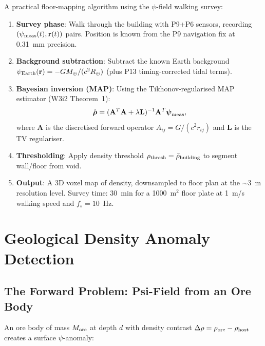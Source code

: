 \documentclass[aps,prd,twocolumn,superscriptaddress,nofootinbib]{revtex4-2}
\begin{document}
A practical floor-mapping algorithm using the $\psi$-field walking survey:

\begin{enumerate}
\item \textbf{Survey phase}: Walk through the building with P9+P6 sensors,
  recording $(\psi_{\rm meas}(t), \mathbf{r}(t))$ pairs.  Position is
  known from the P9 navigation fix at 0.31~mm precision.

\item \textbf{Background subtraction}: Subtract the known Earth background
  $\psi_{\rm Earth}(\mathbf{r}) = -GM_\oplus/(c^2 R_\oplus)$ (plus P13
  timing-corrected tidal terms).

\item \textbf{Bayesian inversion (MAP)}: Using the Tikhonov-regularised
  MAP estimator (W3i2 Theorem~1):
  \begin{equation}
    \hat{\boldsymbol{\rho}} = (\mathbf{A}^T\mathbf{A} + \lambda\mathbf{L})^{-1}
    \mathbf{A}^T \boldsymbol{\psi}_{\rm meas},
    \label{eq:floor-inversion}
  \end{equation}
  where $\mathbf{A}$ is the discretised forward operator
  $A_{ij} = G/(c^2 r_{ij})$ and $\mathbf{L}$ is the TV regulariser.

\item \textbf{Thresholding}: Apply density threshold
  $\rho_{\rm thresh} = \bar\rho_{\rm building}$ to segment
  wall/floor from void.

\item \textbf{Output}: A 3D voxel map of density, downsampled to floor
  plan at the $\sim 3$~m resolution level.  Survey time: 30~min for
  a 1000~m$^2$ floor plate at 1~m/s walking speed and $f_s = 10$~Hz.
\end{enumerate}

\section{Geological Density Anomaly Detection}
\label{sec:geology}

\subsection{The Forward Problem: Psi-Field from an Ore Body}

An ore body of mass $M_{\rm ore}$ at depth $d$ with density contrast
$\Delta\rho = \rho_{\rm ore} - \rho_{\rm host}$ creates a surface
$\psi$-anomaly:
\end{document}
